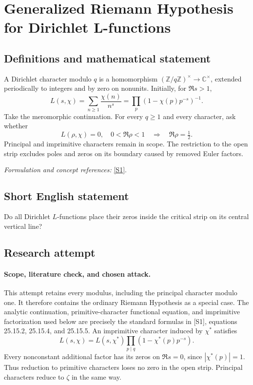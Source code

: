 \documentclass[11pt]{article}
\begin{document}
\section*{\texorpdfstring{Generalized Riemann Hypothesis for Dirichlet L-functions}{Generalized Riemann Hypothesis for Dirichlet L-functions}}\label{9}
\subsection{Definitions and mathematical statement}
A Dirichlet character modulo $q$ is a homomorphism $({\mathbb{Z}}/q{\mathbb{Z}})^\times\to{\mathbb{C}}^\times$, extended periodically to integers and by zero on nonunits. Initially, for $\Re s>1$,
\[
 L(s,\chi)=\sum_{n\ge1}\frac{\chi(n)}{n^s}=\prod_p(1-\chi(p)p^{-s})^{-1}.
\]
Take the meromorphic continuation. For every $q\ge1$ and every character, ask whether
\[
 L(\rho,\chi)=0,\quad0<\Re\rho<1\quad\Longrightarrow\quad\Re\rho=\tfrac12.
\]
Principal and imprimitive characters remain in scope. The restriction to the open strip excludes poles and zeros on its boundary caused by removed Euler factors.
\par\smallskip\textit{Formulation and concept references:} \href{https://dlmf.nist.gov/25.15}{[S1]}.

\subsection{Short English statement}
Do all Dirichlet $L$-functions place their zeros inside the critical strip on its central vertical line?
\subsection{Research attempt}

\paragraph{Scope, literature check, and chosen attack.}
This attempt retains every modulus, including the principal character modulo
one. It therefore contains the ordinary Riemann Hypothesis as a special case.
The analytic continuation, primitive-character functional equation, and
imprimitive factorization used below are precisely the standard formulas
in [S1], equations 25.15.2, 25.15.4, and 25.15.5. An imprimitive character
induced by $\chi^*$ satisfies
\[
 L(s,\chi)=L(s,\chi^*)\prod_{p\mid q}(1-\chi^*(p)p^{-s}).
\]
Every nonconstant additional factor has its zeros on $\Re s=0$, since
$|\chi^*(p)|=1$. Thus reduction to primitive characters loses no zero in the
open strip. Principal characters reduce to $\zeta$ in the same way.
\end{document}
